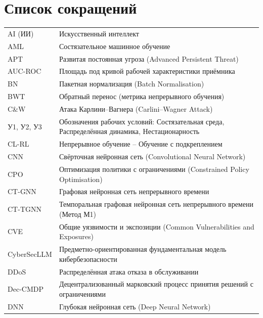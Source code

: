 
\chapter*{Список сокращений}

\begin{longtable}{@{}p{3.8cm} p{10cm}@{}}
AI (ИИ) & Искусственный интеллект \\
AML & Состязательное машинное обучение \\
APT & Развитая постоянная угроза (Advanced Persistent Threat) \\
AUC-ROC & Площадь под кривой рабочей характеристики приёмника \\
BN & Пакетная нормализация (Batch Normalisation) \\
BWT & Обратный перенос (метрика непрерывного обучения) \\
C\&W & Атака Карлини--Вагнера (Carlini--Wagner Attack) \\
У1, У2, У3 & Обозначения рабочих условий: Состязательная среда, Распределённая динамика, Нестационарность \\
CL-RL & Непрерывное обучение -- Обучение с подкреплением \\
CNN & Свёрточная нейронная сеть (Convolutional Neural Network) \\
CPO & Оптимизация политики с ограничениями (Constrained Policy Optimisation) \\
CT-GNN & Графовая нейронная сеть непрерывного времени \\
CT-TGNN & Темпоральная графовая нейронная сеть непрерывного времени (Метод М1) \\
CVE & Общие уязвимости и экспозиции (Common Vulnerabilities and Exposures) \\
CyberSecLLM & Предметно-ориентированная фундаментальная модель кибербезопасности \\
DDoS & Распределённая атака отказа в обслуживании \\
Dec-CMDP & Децентрализованный марковский процесс принятия решений с ограничениями \\
DNN & Глубокая нейронная сеть (Deep Neural Network) \\

\end{longtable}
